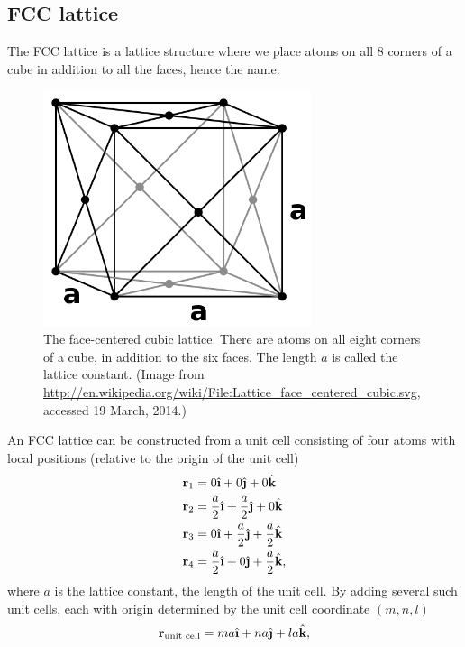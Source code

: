 \subsection{FCC lattice}
The FCC lattice is a lattice structure where we place atoms on all 8 corners of a cube in addition to all the faces, hence the name. 
\begin{figure}[h!]
\begin{center}
\includegraphics[width=0.7\textwidth, trim=0cm 0cm 0cm 0cm, clip]{MD/figures/fcc.png}
\end{center}
\caption{The face-centered cubic lattice. There are atoms on all eight corners of a cube, in addition to the six faces. The length $a$ is called the lattice constant. (Image from \url{http://en.wikipedia.org/wiki/File:Lattice_face_centered_cubic.svg}, accessed 19 March, 2014.)}
\label{fig:md_parallelization_2}
\end{figure}
An FCC lattice can be constructed from a unit cell consisting of four atoms with local positions (relative to the origin of the unit cell)
\begin{align}
	\vec r_1 &= 0\ihat + 0 \jhat + 0 \khat\\
	\vec r_2 &= \frac{a}{2}\ihat + \frac{a}{2} \jhat + 0 \khat\\
	\vec r_3 &= 0\ihat + \frac{a}{2} \jhat + \frac{a}{2} \khat\\
	\vec r_4 &= \frac{a}{2}\ihat + 0 \jhat + \frac{a}{2} \khat,
\end{align}
where $a$ is the lattice constant, the length of the unit cell. By adding several such unit cells, each with origin determined by the unit cell coordinate $(m,n,l)$
\begin{align}
	\vec r_\text{unit cell} = ma\ihat + na\jhat + la\khat,
\end{align}
